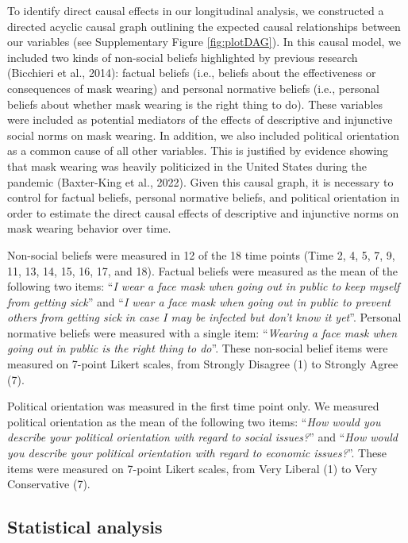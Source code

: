 \documentclass[
  man, donotrepeattitle,mask,floatsintext]{apa6}
\begin{document}
To identify direct causal effects in our longitudinal analysis, we constructed a directed acyclic causal graph outlining the expected causal relationships between our variables (see Supplementary Figure \ref{fig:plotDAG}). In this causal model, we included two kinds of non-social beliefs highlighted by previous research (Bicchieri et al., 2014): factual beliefs (i.e., beliefs about the effectiveness or consequences of mask wearing) and personal normative beliefs (i.e., personal beliefs about whether mask wearing is the right thing to do). These variables were included as potential mediators of the effects of descriptive and injunctive social norms on mask wearing. In addition, we also included political orientation as a common cause of all other variables. This is justified by evidence showing that mask wearing was heavily politicized in the United States during the pandemic (Baxter-King et al., 2022). Given this causal graph, it is necessary to control for factual beliefs, personal normative beliefs, and political orientation in order to estimate the direct causal effects of descriptive and injunctive norms on mask wearing behavior over time.

Non-social beliefs were measured in 12 of the 18 time points (Time 2, 4, 5, 7, 9, 11, 13, 14, 15, 16, 17, and 18). Factual beliefs were measured as the mean of the following two items: ``\emph{I wear a face mask when going out in public to keep myself from getting sick}'' and ``\emph{I wear a face mask when going out in public to prevent others from getting sick in case I may be infected but don't know it yet}''. Personal normative beliefs were measured with a single item: ``\emph{Wearing a face mask when going out in public is the right thing to do}''. These non-social belief items were measured on 7-point Likert scales, from Strongly Disagree (1) to Strongly Agree (7).

Political orientation was measured in the first time point only. We measured political orientation as the mean of the following two items: ``\emph{How would you describe your political orientation with regard to social issues?}'' and ``\emph{How would you describe your political orientation with regard to economic issues?}''. These items were measured on 7-point Likert scales, from Very Liberal (1) to Very Conservative (7).

\hypertarget{statistical-analysis}{%
\subsection{Statistical analysis}\label{statistical-analysis}}
\end{document}

